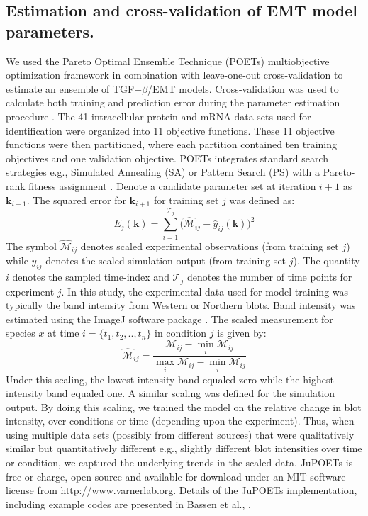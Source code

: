 \subsection*{Estimation and cross-validation of EMT model parameters.}
We used the Pareto Optimal Ensemble Technique (POETs) multiobjective optimization framework in combination with leave-one-out cross-validation to estimate an ensemble of TGF$-\beta$/EMT models.
Cross-validation was used to calculate both training and prediction error during the parameter estimation procedure \citep{kohavi1995study}.
The 41 intracellular protein and mRNA data-sets used for identification were organized into 11 objective functions.
These 11 objective functions were then partitioned, where each partition contained ten training objectives and one validation objective.
POETs integrates standard search strategies e.g., Simulated Annealing (SA) or Pattern Search (PS)
with a Pareto-rank fitness assignment \citep{Song:2010fk,JuPOETs-BioArXiv}.
Denote a candidate parameter set at iteration $i+1$ as $\mathbf{k}_{i+1}$.
The squared error for $\mathbf{k}_{i+1}$ for training set $j$ was defined as:
\begin{equation}\label{eqn_cost2}
	E_{j}(\mathbf{k}) = \sum_{i=1}^{\mathcal{T}_{j}}\biggl(\hat{\mathcal{M}}_{ij}-\hat{y}_{ij}(\mathbf{k})\biggr)^2
\end{equation}
The symbol $\hat{\mathcal{M}}_{ij}$ denotes scaled experimental observations (from training set $j$) while $\hat{y}_{ij}$ denotes the scaled simulation output (from training set $j$).
The quantity $i$ denotes the sampled time-index and $\mathcal{T}_{j}$ denotes the number of time points for experiment $j$.
In this study, the experimental data used for model training was typically the band intensity from Western or Northern blots.
Band intensity was estimated using the ImageJ software package \citep{IMAGEJ}.
The scaled measurement for species $x$ at time $i=\{t_{1},t_{2},..,t_{n}\}$ in condition $j$ is given by:
\begin{equation}\label{norm_exp_data}
\hat{\mathcal{M}}_{ij} = \frac{\mathcal{M}_{ij} - \min_{i}\mathcal{M}_{ij}}{\max_{i}{\mathcal{M}_{ij}}-\min_{i}{\mathcal{M}_{ij}}}
\end{equation}
Under this scaling, the lowest intensity band equaled zero while the highest intensity band equaled one.
A similar scaling was defined for the simulation output. By doing this scaling, we trained the model on the relative change in blot intensity, over conditions or time (depending upon the experiment). Thus, when using multiple data sets (possibly from different sources) that were qualitatively similar but quantitatively different e.g., slightly different blot intensities over time or condition, we captured the underlying trends in the scaled data.
JuPOETs is free or charge, open source and available for download under an MIT software license from http://www.varnerlab.org.
Details of the JuPOETs implementation, including example codes are presented in Bassen et al., \citep{JuPOETs-BioArXiv}.

